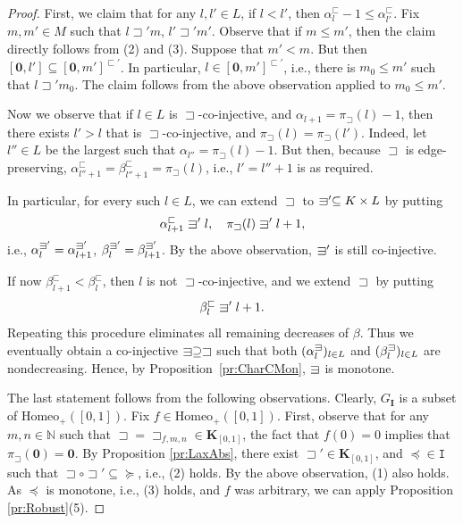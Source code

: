 \documentclass[12pt]{amsart}
\numberwithin{equation}{section}
\theoremstyle{plain}
\theoremstyle{definition}
\newcommand{\sqni}{\mathrel{\vphantom{\sqsupset}\text{\mathsurround=0pt\ooalign{$\sqsupset$\cr$-$\cr}}}}
\newcommand \Homeo{ \mbox{Homeo}}
\newcommand \sqsp{\sqsupset}
\newcommand \sqsb{\sqsubset}
\newcommand \rt{\mathbf{0}}
\newcommand \IIb{\mathbf{I}}
\newcommand \KKb{\mathbf{K}}
\newcommand \NN{\mathbb{N}}
\newcommand \It{\mathtt{I}}
\begin{document}
  \begin{proof}
  	First, we claim that for any $l,l' \in L$, if $l<l'$, then $\alpha^\sqsb_{l}-1 \leq \alpha^\sqsb_{l'}$. Fix $m,m' \in M$ such that $l  \sqsp' m$, $l'  \sqsp' m'$. Observe that if $m \leq m'$, then the claim directly follows from (2) and (3). Suppose that $m'<m$. But then $[\rt,l'] \subseteq [\rt,m']^{\sqsb'}$. In particular,  $l \in [\rt,m']^{\sqsb'}$, i.e., there is $m_0 \leq m'$ such that $l \sqsp' m_0$. The claim follows from the above observation applied to $m_0 \leq m'$.
  	
  	Now we observe that if $l \in L$ is $\sqsp$-co-injective, and $\alpha_{l+1}= \pi_\sqsp(l)-1$, then there exists $l'>l$ that is $\sqsp$-co-injective, and $\pi_\sqsp(l)=\pi_\sqsp(l')$. 
  	Indeed, let $l'' \in L$ be the largest such that $\alpha_{l''}= \pi_\sqsp(l)-1$. But then, because $\sqsp$ is edge-preserving, $\alpha^\sqsb_{l''+1}=\beta^\sqsb_{l''+1}=\pi_\sqsp(l)$, i.e.,  $l'=l''+1$ is as required.
  	
  	In particular, for every such $l \in L$, we can extend $\sqsp$ to $\sqni' \subseteq K \times L$ by putting $$\alpha^\sqsb_{l+1} \sqni' l, \quad \pi_\sqsp(l) \sqni' l+1,$$ i.e., $\alpha^{\sqni'}_{l}=\alpha^{\sqni'}_{l+1}$, $\beta^{\sqni'}_l=\beta^{\sqni'}_{l+1}$. By the above observation, $\sqni'$ is still co-injective. 
  	
  	If now $\beta^{\sqsb}_{l+1}<\beta^{\sqsb}_l$, then $l$ is not $\sqsp$-co-injective, and we extend $\sqsp$ by putting
  	\[
  	\beta^{\sqsb}_l\sqni' l+1.
  	\]
  	Repeating this procedure eliminates all remaining decreases of
  	$\beta$. Thus we eventually obtain a co-injective
  	$\sqni\supseteq\sqsp$ such that both
  	$(\alpha^{\sqni}_l)_{l\in L}$ and
  	$(\beta^{\sqni}_l)_{l\in L}$ are nondecreasing. Hence, by
  	Proposition~\ref{pr:CharCMon}, $\sqni$ is monotone.
  	
  	The last statement follows from the following observations. Clearly, $G_\IIb$ is a subset of $\Homeo_+([0,1])$.  Fix  $f \in \Homeo_+([0,1])$. First, observe that for any $m,n \in \NN$ such that $\sqsp=\sqsp_{f,m,n} \in \KKb_{[0,1]}$, the fact that $f(0)=0$ implies that $\pi_{\sqsp}(\rt)=\rt$. By Proposition \ref{pr:LaxAbs}, there exist $\sqsp' \in  \KKb_{[0,1]}$, and $\preceq \in \It$ such that $\sqsp \circ \sqsp' \subseteq \succeq$, i.e., (2) holds. By the above observation, (1) also holds. As $\preceq$ is monotone, i.e., (3) holds, and $f$ was arbitrary, we can apply Proposition \ref{pr:Robust}(5).
  \end{proof}
  
\end{document}
